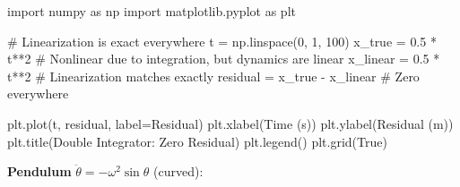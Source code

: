 \documentclass[
  letterpaper,
  DIV=11,
  numbers=noendperiod]{scrartcl}
\newenvironment{Shaded}{\begin{snugshade}}{\end{snugshade}}
\newcommand{\CommentTok}[1]{\textcolor[rgb]{0.37,0.37,0.37}{#1}}
\newcommand{\DecValTok}[1]{\textcolor[rgb]{0.68,0.00,0.00}{#1}}
\newcommand{\FloatTok}[1]{\textcolor[rgb]{0.68,0.00,0.00}{#1}}
\newcommand{\ImportTok}[1]{\textcolor[rgb]{0.00,0.46,0.62}{#1}}
\newcommand{\NormalTok}[1]{\textcolor[rgb]{0.00,0.23,0.31}{#1}}
\newcommand{\OperatorTok}[1]{\textcolor[rgb]{0.37,0.37,0.37}{#1}}
\newcommand{\StringTok}[1]{\textcolor[rgb]{0.13,0.47,0.30}{#1}}
\newcommand{\VariableTok}[1]{\textcolor[rgb]{0.07,0.07,0.07}{#1}}
\begin{document}
\begin{Shaded}
\begin{Highlighting}[]
\ImportTok{import}\NormalTok{ numpy }\ImportTok{as}\NormalTok{ np}
\ImportTok{import}\NormalTok{ matplotlib.pyplot }\ImportTok{as}\NormalTok{ plt}

\CommentTok{\# Linearization is exact everywhere}
\NormalTok{t }\OperatorTok{=}\NormalTok{ np.linspace(}\DecValTok{0}\NormalTok{, }\DecValTok{1}\NormalTok{, }\DecValTok{100}\NormalTok{)}
\NormalTok{x\_true }\OperatorTok{=} \FloatTok{0.5} \OperatorTok{*}\NormalTok{ t}\OperatorTok{**}\DecValTok{2}  \CommentTok{\# Nonlinear due to integration, but dynamics are linear}
\NormalTok{x\_linear }\OperatorTok{=} \FloatTok{0.5} \OperatorTok{*}\NormalTok{ t}\OperatorTok{**}\DecValTok{2}  \CommentTok{\# Linearization matches exactly}
\NormalTok{residual }\OperatorTok{=}\NormalTok{ x\_true }\OperatorTok{{-}}\NormalTok{ x\_linear  }\CommentTok{\# Zero everywhere}

\NormalTok{plt.plot(t, residual, label}\OperatorTok{=}\StringTok{\textquotesingle{}Residual\textquotesingle{}}\NormalTok{)}
\NormalTok{plt.xlabel(}\StringTok{\textquotesingle{}Time (s)\textquotesingle{}}\NormalTok{)}
\NormalTok{plt.ylabel(}\StringTok{\textquotesingle{}Residual (m)\textquotesingle{}}\NormalTok{)}
\NormalTok{plt.title(}\StringTok{\textquotesingle{}Double Integrator: Zero Residual\textquotesingle{}}\NormalTok{)}
\NormalTok{plt.legend()}
\NormalTok{plt.grid(}\VariableTok{True}\NormalTok{)}
\end{Highlighting}
\end{Shaded}

\textbf{Pendulum} \(\ddot{\theta} = -\omega^2 \sin\theta\) (curved):
\end{document}

